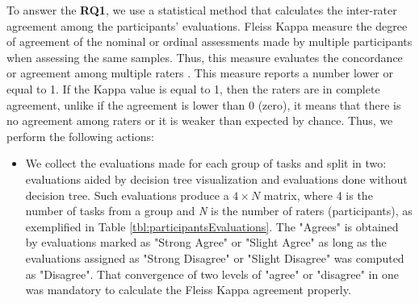 To answer the \textbf{RQ1}, we use a statistical method that calculates the inter-rater agreement among the participants’ evaluations. Fleiss Kappa \cite{fleiss1971measuring} measure the degree of agreement of the nominal or ordinal assessments made by multiple participants when assessing the same samples. Thus, this measure evaluates the concordance or agreement among multiple raters \cite{fleiss1971measuring}. This measure reports a number lower or equal to 1. If the Kappa value is equal to 1, then the raters are in complete agreement, unlike if the agreement is lower than 0 (zero), it means that there is no agreement among raters or it is weaker than expected by chance. Thus, we perform the following actions:
\begin{itemize}
    \item We collect the evaluations made for each group of tasks and split in two: evaluations aided by decision tree visualization and evaluations done without decision tree. Such evaluations produce a $4 \times N$ matrix, where 4 is the number of tasks from a group and \textit{N} is the number of raters (participants), as exemplified in Table \ref{tbl:participantsEvaluations}. The "Agrees" is obtained by evaluations marked as "Strong Agree" or "Slight Agree" as long as the evaluations assigned as "Strong Disagree" or "Slight Disagree" was computed as "Disagree". That convergence of two levels of "agree" or "disagree" in one was mandatory to calculate the Fleiss Kappa agreement properly. %
    

\end{itemize}
